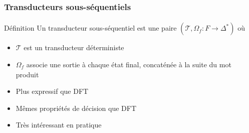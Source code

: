 \frametitle{Transducteurs sous-séquentiels}
\framesubtitle{}

\begin{block}{Définition}
	Un transducteur sous-séquentiel est une paire $(\mathscr{T}, \Omega_f : F \to \Delta^*)$ où
	\begin{itemize}
		\item $\mathscr{T}$ est un transducteur déterministe
		\item $\Omega_f$ associe une sortie à chaque état final, concaténée à la suite du mot produit
	\end{itemize}
\end{block}

\begin{itemize}
	\item Plus expressif que DFT
	\item Mêmes propriétés de décision que DFT
	\item Très intéressant en pratique
\end{itemize}
